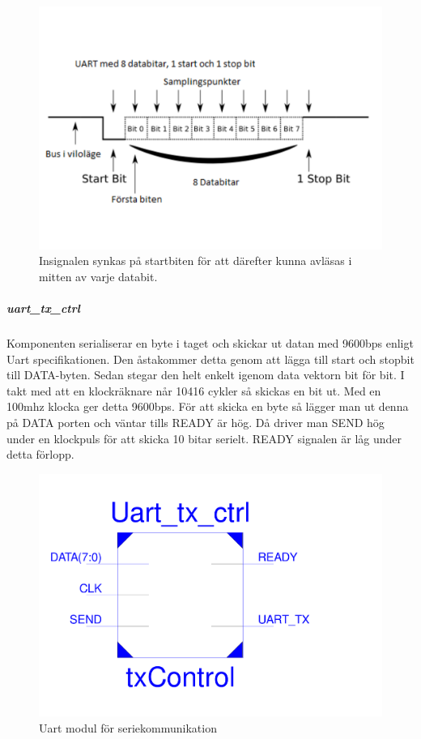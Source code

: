\documentclass[a4paper]{scrartcl}
\begin{document}
		\begin{figure}[H]
			\centering
			\includegraphics[scale=0.4]{uartsignal.pdf}
			\caption{Insignalen synkas på startbiten för att därefter kunna avläsas i mitten av varje databit.}
		\end{figure}

		\subparagraph{uart\_tx\_ctrl}
		Komponenten serialiserar en byte i taget och skickar ut datan med 9600bps enligt Uart specifikationen. Den åstakommer detta genom att lägga till start och stopbit till DATA-byten. Sedan stegar den helt enkelt igenom data vektorn bit för bit.  I takt med att en klockräknare når 10416 cykler så skickas en bit ut.  Med en 100mhz klocka ger detta 9600bps.
		För att skicka en byte så lägger man ut denna på DATA porten och väntar tills READY är hög. Då driver man SEND hög under en klockpuls för att skicka 10 bitar serielt. READY signalen är låg under detta förlopp. 

		\begin{figure}[H]
			\centering
			\includegraphics[scale=0.4]{txschematic.pdf}
			\caption{Uart modul för seriekommunikation}
		\end{figure}
\end{document}
